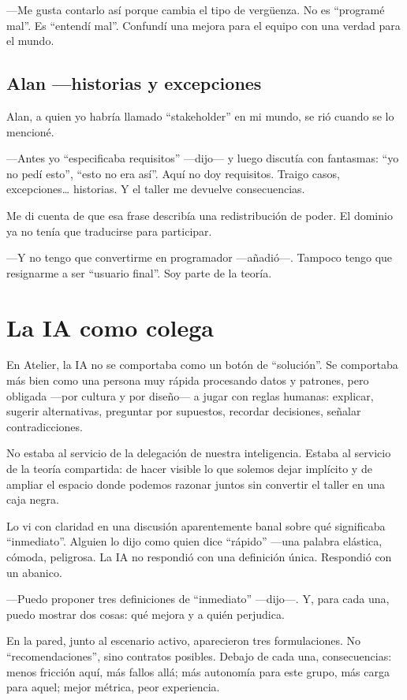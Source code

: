 \documentclass[11pt,a4paper]{article}
\begin{document}
---Me gusta contarlo así porque cambia el tipo de vergüenza. No es ``programé
mal''. Es ``entendí mal''. Confundí una mejora para el equipo con una verdad
para el mundo.

\subsection{Alan ---historias y excepciones}

Alan, a quien yo habría llamado ``stakeholder'' en mi mundo, se rió cuando se
lo mencioné.

---Antes yo ``especificaba requisitos'' ---dijo--- y luego discutía con
fantasmas: ``yo no pedí esto'', ``esto no era así''. Aquí no doy requisitos.
Traigo casos, excepciones\ldots{} historias. Y el taller me devuelve
consecuencias.

Me di cuenta de que esa frase describía una redistribución de poder. El
dominio ya no tenía que traducirse para participar.

---Y no tengo que convertirme en programador ---añadió---. Tampoco tengo que
resignarme a ser ``usuario final''. Soy parte de la teoría.

\section{La IA como colega}

En Atelier, la IA no se comportaba como un botón de ``solución''. Se
comportaba más bien como una persona muy rápida procesando datos y patrones,
pero obligada ---por cultura y por diseño--- a jugar con reglas humanas:
explicar, sugerir alternativas, preguntar por supuestos, recordar decisiones,
señalar contradicciones.

No estaba al servicio de la delegación de nuestra inteligencia. Estaba al
servicio de la teoría compartida: de hacer visible lo que solemos dejar
implícito y de ampliar el espacio donde podemos razonar juntos sin convertir
el taller en una caja negra.

Lo vi con claridad en una discusión aparentemente banal sobre qué significaba
``inmediato''. Alguien lo dijo como quien dice ``rápido'' ---una palabra
elástica, cómoda, peligrosa. La IA no respondió con una definición única.
Respondió con un abanico.

---Puedo proponer tres definiciones de ``inmediato'' ---dijo---. Y, para cada
una, puedo mostrar dos cosas: qué mejora y a quién perjudica.

En la pared, junto al escenario activo, aparecieron tres formulaciones. No
``recomendaciones'', sino contratos posibles. Debajo de cada una,
consecuencias: menos fricción aquí, más fallos allá; más autonomía para este
grupo, más carga para aquel; mejor métrica, peor experiencia.
\end{document}
